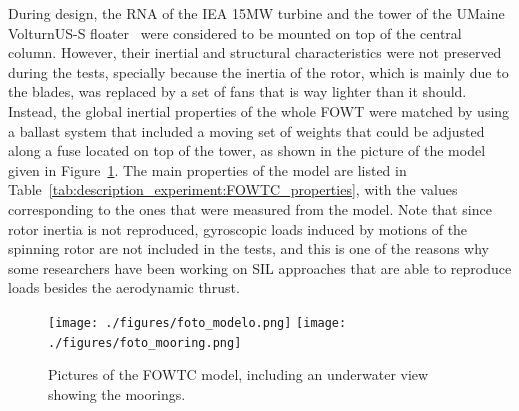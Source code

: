 During design, the RNA of the IEA 15MW turbine \citep{gaertner2020definition} and the tower of the UMaine VolturnUS-S floater~\citep{allen2020definition} were considered to be mounted on top of the central column. However, their inertial and structural characteristics were not preserved during the tests, specially because the inertia of the rotor, which is mainly due to the blades, was replaced by a set of fans that is way lighter than it should. Instead, the global inertial properties of the whole FOWT were matched by using a ballast system that included a moving set of weights that could be adjusted along a fuse located on top of the tower, as shown in the picture of the model given in Figure~\ref{fig:description_experiment:modelo}. The main properties of the model are listed in Table~\ref{tab:description_experiment:FOWTC_properties}, with the values corresponding to the ones that were measured from the model. Note that since rotor inertia is not reproduced, gyroscopic loads induced by motions of the spinning rotor are not included in the tests, and this is one of the reasons why some researchers have been working on SIL approaches that are able to reproduce loads besides the aerodynamic thrust.
\begin{figure}[!hbtp]
	\centering
	\texttt{[image: ./figures/foto\_modelo.png]}%
\hspace{12pt}    
    \texttt{[image: ./figures/foto\_mooring.png]}%
	\caption{Pictures of the FOWTC model, including an underwater view showing the moorings.} \label{fig:description_experiment:modelo}%
\end{figure}%

